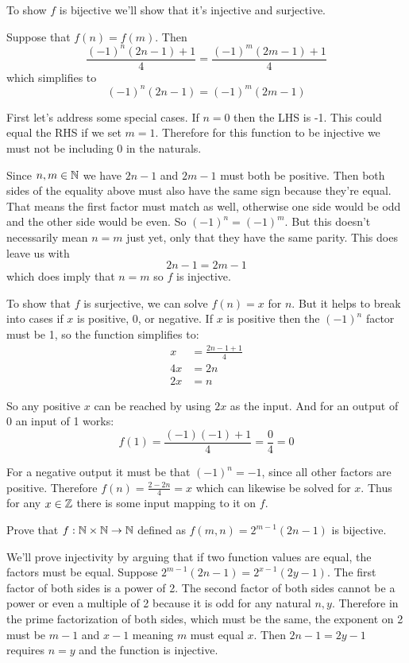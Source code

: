 \documentclass{article}
\begin{document}
To show $f$ is bijective we'll show that it's injective and surjective.

Suppose that $f(n) = f(m)$. Then
$$\frac{(-1)^n (2n - 1) + 1}{4} = \frac{(-1)^m(2m-1) + 1}{4}$$
which simplifies to
$$(-1)^n (2n -1) = (-1)^m (2m - 1)$$

First let's address some special cases. If $n = 0$ then the LHS is -1. This could equal the RHS if we set $m = 1$. Therefore for this function to be injective we must not be including 0 in the naturals.

Since $n, m \in \mathbb{N}$ we have $2n - 1$ and $2m - 1$ must both be positive. Then both sides of the equality above must also have the same sign because they're equal. That means the first factor must match as well, otherwise one side would be odd and the other side would be even. So $(-1)^n = (-1)^m$. But this doesn't necessarily mean $n = m$ just yet, only that they have the same parity. This does leave us with
$$2n - 1 = 2m - 1$$
which does imply that $n = m$ so $f$ is injective.

To show that $f$ is surjective, we can solve $f(n) = x$ for $n$. But it helps to break into cases if $x$ is positive, 0, or negative. If $x$ is positive then the $(-1)^n$ factor must be 1, so the function simplifies to:
\begin{align*}
  x  & = \frac{2n - 1 + 1}{4} \\
  4x & = 2n                   \\
  2x & = n
\end{align*}

So any positive $x$ can be reached by using $2x$ as the input. And for an output of 0 an input of 1 works:
$$f(1) = \frac{(-1)(-1) + 1}{4} = \frac{0}{4} = 0$$

For a negative output it must be that $(-1)^n = -1$, since all other factors are positive. Therefore $f(n) = \frac{2 - 2n}{4} = x$ which can likewise be solved for $x$. Thus for any $x \in \mathbb{Z}$ there is some input mapping to it on $f$.

\begin{problem}
Prove that $f: \mathbb{N} \times \mathbb{N} \to \mathbb{N}$ defined as $f(m, n) = 2^{m-1}(2n - 1)$ is bijective.
\end{problem}

We'll prove injectivity by arguing that if two function values are equal, the factors must be equal. Suppose $2^{m-1}(2n - 1) = 2^{x -1}(2y - 1)$. The first factor of both sides is a power of 2. The second factor of both sides cannot be a power or even a multiple of 2 because it is odd for any natural $n, y$. Therefore in the prime factorization of both sides, which must be the same, the exponent on 2 must be $m - 1$ and $x - 1$ meaning $m$ must equal $x$. Then $2n -1 = 2y - 1$ requires $n = y$ and the function is injective.
\end{document}
